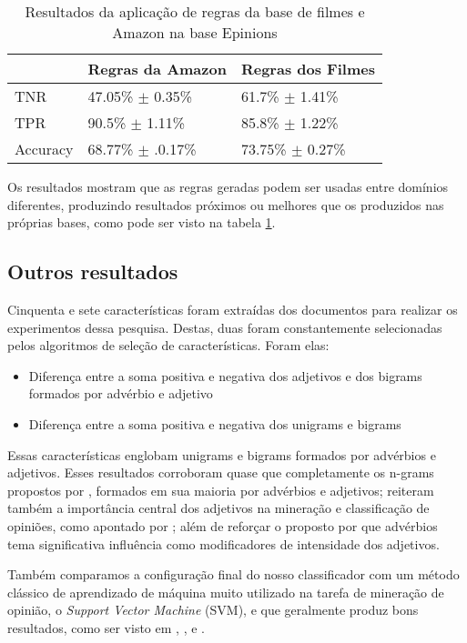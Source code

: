 \begin{table}[!h]
    \begin{tabular}{lll}
    ~         		& Regras da Amazon 					& Regras dos Filmes \\ \hline
    TNR 			& 47.05\% $\pm$ 0.35\%           & 61.7\% $\pm$ 1.41\%    \\
    TPR    		& 90.5\% $\pm$ 1.11\% 				& 85.8\% $\pm$ 1.22\%   \\
    Accuracy  	& 68.77\% $\pm$ .0.17\%         	& 73.75\% $\pm$ 0.27\%    \\
    \end{tabular}
    \caption{Resultados da aplicação de regras da base de filmes e Amazon na base Epinions}
	\label{table:epinions}
\end{table}

Os resultados mostram que as regras geradas podem ser usadas entre domínios diferentes, produzindo resultados próximos ou melhores que os produzidos nas próprias bases, como pode ser visto na tabela \ref{table:epinions}.

\subsection{Outros resultados}

Cinquenta e sete características foram extraídas dos documentos para realizar os experimentos dessa pesquisa. Destas, duas foram constantemente selecionadas pelos algoritmos de seleção de características. Foram elas:

\begin{itemize}
\item Diferença entre a soma positiva e negativa dos adjetivos e dos bigrams formados por advérbio e adjetivo
\item Diferença entre a soma positiva e negativa dos unigrams e bigrams
\end{itemize}

Essas características englobam unigrams e bigrams formados por advérbios e adjetivos. Esses resultados corroboram quase que completamente os n-grams propostos por \cite{turney2002thumbs}, formados em sua maioria por advérbios e adjetivos; reiteram também a importância central dos adjetivos na mineração e classificação de opiniões, como apontado por \cite{voll2007not}; além de reforçar o proposto por \cite{benamara2007sentiment} que advérbios tema significativa influência como modificadores de intensidade dos adjetivos.

Também comparamos a configuração final do nosso classificador com um método clássico de aprendizado de máquina muito utilizado na tarefa de mineração de opinião, o \textit{Support Vector Machine} (SVM), e que geralmente produz bons resultados, como ser visto em \cite{moraes2012document}, \cite{pang2002thumbs}, \cite{pang2004sentimental} e \cite{wilson2004just}. 

